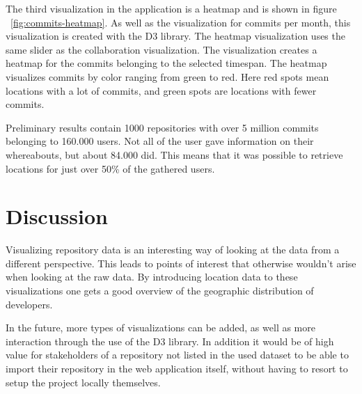 \documentclass[acmtog, authorversion]{acmart}
\begin{document}
The third visualization in the application is a heatmap and is shown in figure ~\ref{fig:commits-heatmap}. 
As well as the visualization for commits per month, this visualization is created with the D3 library.
The heatmap visualization uses the same slider as the collaboration visualization.
The visualization creates a heatmap for the commits belonging to the selected timespan.
The heatmap visualizes commits by color ranging from green to red. 
Here red spots mean locations with a lot of commits, and green spots are locations with fewer commits.


Preliminary results contain 1000 repositories with over 5 million commits belonging to 160.000 users.
Not all of the user gave information on their whereabouts, but about 84.000 did.
This means that it was possible to retrieve locations for just over 50\% of the gathered users.

\section{Discussion}
Visualizing repository data is an interesting way of looking at the data from a different perspective. 
This leads to points of interest that otherwise wouldn't arise when looking at the raw data. 
By introducing location data to these visualizations one gets a good overview of  the geographic distribution of developers.

In the future, more types of visualizations can be added, as well as more interaction through the use of the D3 library.
In addition it would be of high value for stakeholders of a repository not listed in the used dataset to be able to import their repository in the web application itself, without having to resort to setup the project locally themselves.


\end{document}
